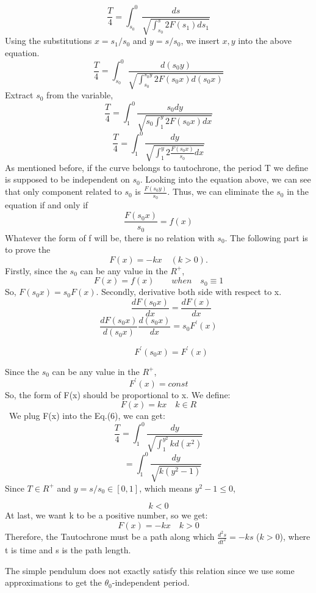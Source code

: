 \documentclass[12pt,a4paper]{article}
\begin{document}
\begin{equation}
\frac{T}{4}=\int_{s_0}^{0} \frac{ds}{\sqrt{\int_{s_0}^{s} 2F(s_1)ds_1}}
\end{equation}
Using the substitutions  $x=s_1/s_{0}$ and $y=s/s_{0}$, we insert $x,y$ into the above equation.
$$\frac{T}{4}=\int_{s_0}^{0} \frac{d(s_{0}y)}{\sqrt{\int_{s_0}^{s_{0}y} 2F(s_{0}x)d(s_{0}x)}}$$
Extract $s_{0}$ from the variable,
$$\frac{T}{4}=\int_{1}^{0} \frac{s_{0}dy}{\sqrt{s_{0}\int_{1}^{y} 2F(s_{0}x)dx}}$$
\begin{equation}
\frac{T}{4}=\int_{1}^{0} \frac{dy}{\sqrt{\int_{1}^{y} 2\frac{F(s_{0}x)}{s_0}dx}}
\end{equation}
As mentioned before, if the curve belongs to tautochrone, the period T we define is supposed to be independent on $s_0$. Looking into the equation above, we can see that only component related to $s_{0}$ is $\frac{F(s_{0}y)}{s_0}$. Thus, we can eliminate the $s_{0}$ in the equation if and only if 
$$\frac{F(s_{0}x)}{s_0}=f(x)$$
Whatever the form of f will be, there is no relation with $s_0$.
The following part is to prove the $$F(x)=-kx\quad(k>0).$$
Firstly, since the $s_{0}$ can be any value in the $R^+$, 
$$F(x)=f(x)\quad\quad when\quad s_{0}\equiv1$$
So, $F(s_{0}x) = s_{0}F(x)$.
Secondly, derivative both side with respect to x.
$$\qquad\quad\frac{dF(s_0x)}{dx}=\frac{dF(x)}{dx}$$
$$\frac{dF(s_0x)}{d(s_0x)}\frac{d(s_0x)}{dx}=s_0F^\prime(x)$$


$$\qquad\quad F^\prime(s_0x)=F^\prime(x)$$

Since the $s_{0}$ can be any value in the $R^+$, 
\begin{equation}
F^\prime(x)=const
\end{equation}
So, the form of F(x) should be proportional to x. We define:
$$F(x)=kx\quad k\in R$$\
We plug F(x) into the Eq.(6), we can get:
$$\frac{T}{4}=\int_{1}^{0} \frac{dy}{\sqrt{\int_{1}^{y^2} kd(x^2)}}$$
$$\quad=\int_{1}^{0} \frac{dy}{\sqrt{k(y^2-1)}}$$
Since $T\in R^+$ and $y=s/s_0\in [0,1]$, which means $y^2-1\leq 0$,

\begin{equation}
k<0
\end{equation}
At last, we want k to be a positive number, so we get:
$$F(x)=-kx\quad k>0$$
Therefore, the Tautochrone must be a path along which $\frac{d^2s}{dt^2}=-ks$ ($k>0$), where t is time and s is the path length.

The simple pendulum does not exactly satisfy this relation since we use some approximations to get the $\theta_0$-independent period.
\end{document}
